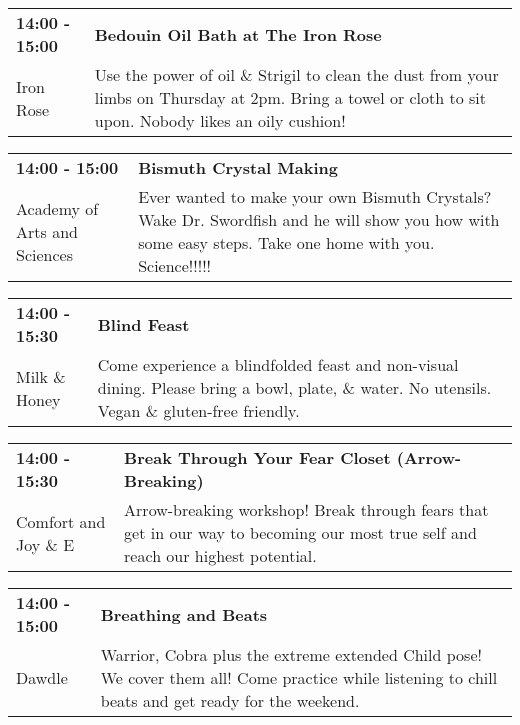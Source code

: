 \begin{tabular}{ p{1in} p{2.2in} }
    \textbf{14:00 - 15:00} & \textbf{Bedouin Oil Bath at The Iron Rose} \\
    Iron Rose \newline  & Use the power of oil \& Strigil to clean the dust from your limbs on Thursday at 2pm. Bring a towel or cloth to sit upon. Nobody likes an oily cushion! \\
    \hline 
\end{tabular}
    
\begin{tabular}{ p{1in} p{2.2in} }
    \textbf{14:00 - 15:00} & \textbf{Bismuth Crystal Making} \\
    Academy of Arts and Sciences \newline  & Ever wanted to make your own Bismuth Crystals?  Wake Dr. Swordfish and he will show you how with some easy steps. Take one home with you. Science!!!!! \\
    \hline 
\end{tabular}
    
\begin{tabular}{ p{1in} p{2.2in} }
    \textbf{14:00 - 15:30} & \textbf{Blind Feast} \\
    Milk \& Honey \newline  & Come experience a blindfolded feast and non-visual dining. Please bring a bowl, plate, \& water. No utensils. Vegan \& gluten-free friendly. \\
    \hline 
\end{tabular}
    
\begin{tabular}{ p{1in} p{2.2in} }
    \textbf{14:00 - 15:30} & \textbf{Break Through Your Fear Closet (Arrow-Breaking)} \\
    Comfort and Joy \newline 7.30 \& E & Arrow-breaking workshop! Break through fears that get in our way to becoming our most true self and reach our highest potential. \\
    \hline 
\end{tabular}
    
\begin{tabular}{ p{1in} p{2.2in} }
    \textbf{14:00 - 15:00} & \textbf{Breathing and Beats} \\
    Dawdle \newline  & Warrior, Cobra plus the extreme extended Child pose! We cover them all! Come practice while listening to chill beats and get ready for the weekend. \\
    \hline 
\end{tabular}
    
